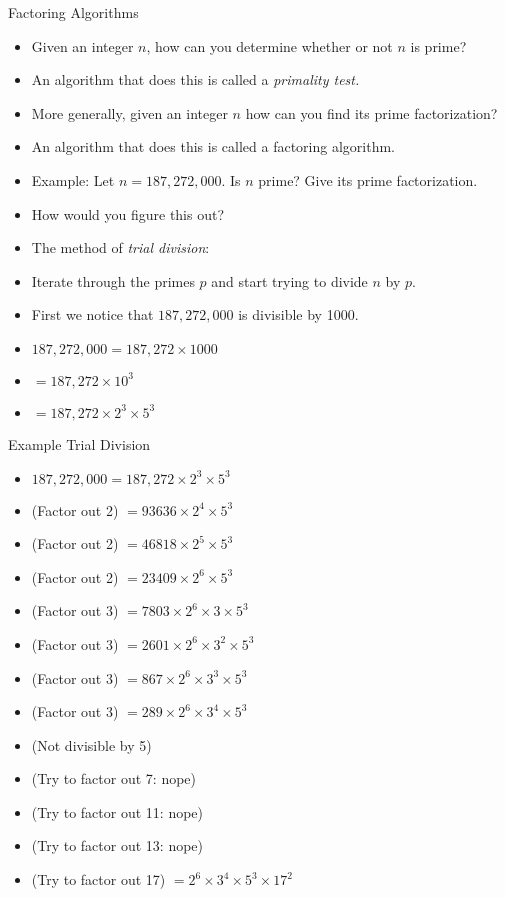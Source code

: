 \documentclass[handout]{beamer}
\begin{document}
\begin{frame}{Factoring Algorithms}

\begin{itemize}
  \item Given an integer $n$, how can you determine whether or not $n$ is prime?
  \item An algorithm that does this is called a \emph{primality test.}
  \item More generally, given an integer $n$ how can you find its prime factorization?
  \item An algorithm that does this is called a factoring algorithm.
  \item Example: Let $n=187,272,000$. Is $n$ prime? Give its prime factorization.
  \item How would you figure this out?
  \item The method of \emph{trial division}:
  \item Iterate through the primes $p$ and start trying to divide $n$ by $p$.
  \item First we notice that $187,272,000$ is divisible by 1000.
  \item $187,272,000 = 187,272 \times 1000 $
  \item $= 187,272 \times 10^3$
  \item $= 187,272 \times 2^3 \times 5^3$
\end{itemize}

\end{frame}

\begin{frame}{Example Trial Division}

\begin{itemize}
  \item $187,272,000 = 187,272 \times 2^3 \times 5^3$
  \item(Factor out 2) $ = 93636 \times 2^4 \times 5^3$
  \item(Factor out 2) $ = 46818 \times 2^5 \times 5^3$
  \item(Factor out 2) $ = 23409 \times 2^6 \times 5^3$
  \item(Factor out 3) $ = 7803 \times 2^6 \times 3  \times 5^3$
  \item(Factor out 3) $ = 2601 \times 2^6 \times 3^2  \times 5^3$
  \item(Factor out 3) $ = 867 \times 2^6 \times 3^3  \times 5^3$
  \item(Factor out 3) $ = 289 \times 2^6 \times 3^4  \times 5^3$
  \item(Not divisible by 5)
  \item(Try to factor out 7: nope)
  \item(Try to factor out 11: nope)
  \item(Try to factor out 13: nope)
  \item(Try to factor out 17) $ = 2^6 \times 3^4  \times 5^3 \times 17^2$
\end{itemize}

\end{frame}
\end{document}
